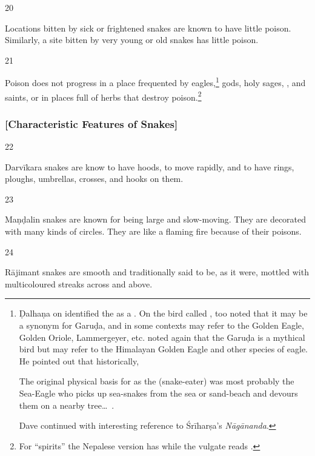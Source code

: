 \begin{translation}
\item [20]

Locations bitten by sick or frightened snakes are known to have little poison.  
Similarly, a site bitten by very young or old snakes has little poison.

\item [21]

Poison does not progress in a place frequented by
eagles,\footnote{Ḍalhaṇa on  identified the 
    as a . On the bird called , \citet[72\,ff,
    514]{dave} too noted that it may be a synonym for Garuḍa,
    and in some contexts may refer to the Golden Eagle, Golden
    Oriole, Lammergeyer, etc. \citet[199\,ff, 492]{dave} noted again that the
    Garuḍa is a mythical bird but may refer to the Himalayan Golden Eagle and
    other species of eagle.  He pointed out that historically,
    \begin{quoting}
        The original physical basis for  as the 
    (snake-eater) was most probably the Sea-Eagle who picks up sea-snakes
    from the sea or sand-beach and devours them on a nearby tree\ldots\  
    \citep[201]{dave}.
    \end{quoting} Dave
    continued with interesting reference to Śrīharṣa's \emph{Nāgānanda}.}
    gods, holy sages, \diff{spirits}, and saints, or in places full of herbs
    that destroy poison.\footnote{For “spirits” the Nepalese version has
        \dev{bhūta} while the vulgate reads \dev{yakṣa}.}

\subsubsection{[Characteristic Features of Snakes]}

\item [22]

Darvīkara snakes are know to have hoods, to move rapidly, and to have rings, 
ploughs, umbrellas, crosses, and hooks on them.


\item [23]

Maṇḍalin snakes are known for being large and slow-moving.  They are 
decorated with many kinds of circles. 
They are like a flaming fire because of their poisons.


\item [24]

Rājimant snakes are smooth and traditionally said to be, as it were,
mottled with multicoloured streaks across and above.


\end{translation}
